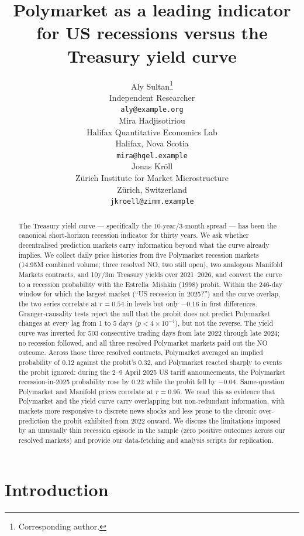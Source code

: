\documentclass{article}
\title{Polymarket as a leading indicator for US recessions versus the Treasury yield curve}
\author{%
  Aly Sultan\thanks{Corresponding author.} \\
  Independent Researcher \\
  \texttt{aly@example.org} \\
  \And
  Mira Hadjisotiriou \\
  Halifax Quantitative Economics Lab \\
  Halifax, Nova Scotia \\
  \texttt{mira@hqel.example} \\
  \And
  Jonas Kr\"oll \\
  Z\"urich Institute for Market Microstructure \\
  Z\"urich, Switzerland \\
  \texttt{jkroell@zimm.example} \\
}
\begin{document}
\maketitle

\begin{abstract}
The Treasury yield curve --- specifically the 10-year/3-month spread --- has been the canonical short-horizon recession indicator for thirty years. We ask whether decentralised prediction markets carry information beyond what the curve already implies. We collect daily price histories from five Polymarket recession markets (\textdollar 14.95M combined volume; three resolved NO, two still open), two analogous Manifold Markets contracts, and 10y/3m Treasury yields over 2021--2026, and convert the curve to a recession probability with the Estrella--Mishkin (1998) probit. Within the 246-day window for which the largest market (``US recession in 2025?'') and the curve overlap, the two series correlate at $r=0.54$ in levels but only $-0.16$ in first differences. Granger-causality tests reject the null that the probit does not predict Polymarket changes at every lag from 1 to 5 days ($p<4\!\times\!10^{-4}$), but not the reverse. The yield curve was inverted for 503 consecutive trading days from late 2022 through late 2024; no recession followed, and all three resolved Polymarket markets paid out the NO outcome. Across those three resolved contracts, Polymarket averaged an implied probability of \num{0.12} against the probit's \num{0.32}, and Polymarket reacted sharply to events the probit ignored: during the 2--9 April 2025 US tariff announcements, the Polymarket recession-in-2025 probability rose by \num{+0.22} while the probit fell by \num{-0.04}. Same-question Polymarket and Manifold prices correlate at $r=0.95$. We read this as evidence that Polymarket and the yield curve carry overlapping but non-redundant information, with markets more responsive to discrete news shocks and less prone to the chronic over-prediction the probit exhibited from 2022 onward. We discuss the limitations imposed by an unusually thin recession episode in the sample (zero positive outcomes across our resolved markets) and provide our data-fetching and analysis scripts for replication.
\end{abstract}

\section{Introduction}
\end{document}
